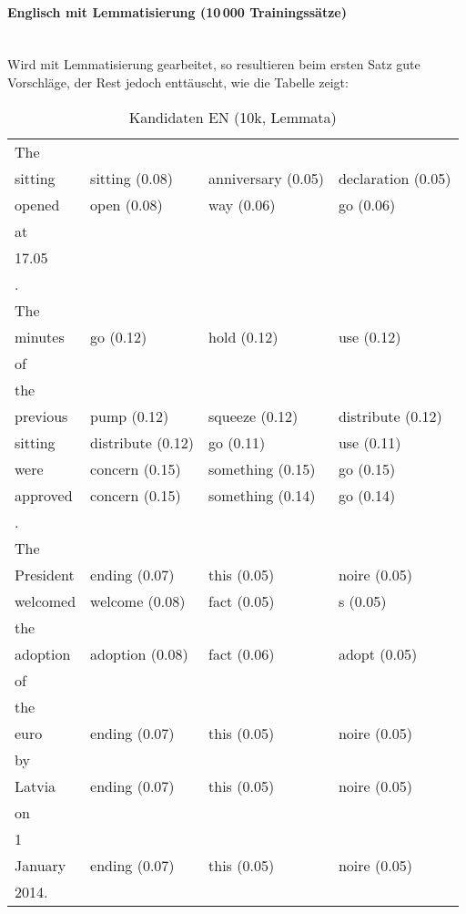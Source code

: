 \documentclass[11pt,twoside,openright]{mpreport}
\begin{document}
\paragraph{Englisch mit Lemmatisierung (10\,000 Trainingssätze)\\\\}
Wird mit Lemmatisierung gearbeitet, so resultieren beim ersten  Satz gute Vorschläge, der Rest jedoch enttäuscht, wie die Tabelle zeigt:
\begin{table}[H]
\hspace{-0cm}\begin{footnotesize}\begin{tabular}{|llll|}
\hline
The & & & \\
sitting                 & sitting (0.08) & anniversary (0.05) & declaration (0.05) \\
opened                  & open (0.08) & way (0.06) & go (0.06) \\
at & & & \\
17.05 & & & \\
. & & & \\
The & & & \\
minutes                 & go (0.12) & hold (0.12) & use (0.12) \\
of & & & \\
the & & & \\
previous                & pump (0.12) & squeeze (0.12) & distribute (0.12) \\
sitting                 & distribute (0.12) & go (0.11) & use (0.11) \\
were                    & concern (0.15) & something (0.15) & go (0.15) \\
approved                & concern (0.15) & something (0.14) & go (0.14) \\
. & & & \\
The & & & \\
President               & ending (0.07) & this (0.05) & noire (0.05) \\
welcomed                & welcome (0.08) & fact (0.05) & s (0.05) \\
the & & & \\
adoption                & adoption (0.08) & fact (0.06) & adopt (0.05) \\
of & & & \\
the & & & \\
euro                    & ending (0.07) & this (0.05) & noire (0.05) \\
by & & & \\
Latvia                  & ending (0.07) & this (0.05) & noire (0.05) \\
on & & & \\
1 & & & \\
January                 & ending (0.07) & this (0.05) & noire (0.05) \\
2014. & & & \\
\hline
\end{tabular}\end{footnotesize}
\caption{Kandidaten EN (10k, Lemmata)}
\end{table}
\end{document}
